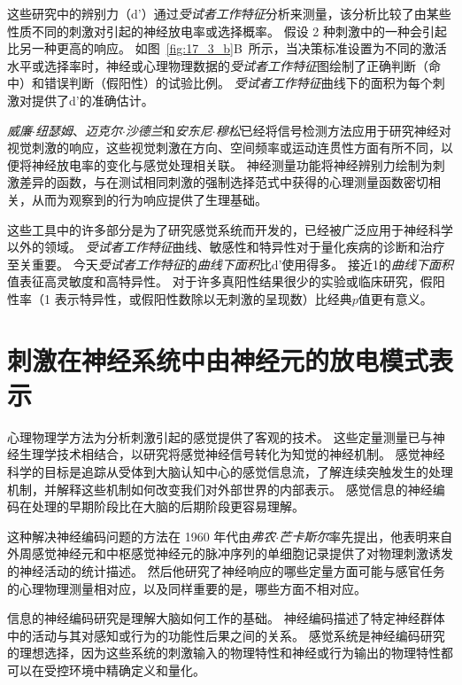 \begin{proposition}
	\quad \quad 这些研究中的辨别力（d'）通过\textit{受试者工作特征}分析来测量，该分析比较了由某些性质不同的刺激对引起的神经放电率或选择概率。
	假设 2 种刺激中的一种会引起比另一种更高的响应。
	如图~\ref{fig:17_3_b}B~所示，当决策标准设置为不同的激活水平或选择率时，神经或心理物理数据的\textit{受试者工作特征}图绘制了正确判断（命中）和错误判断（假阳性）的试验比例。
	\textit{受试者工作特征}曲线下的面积为每个刺激对提供了d'的准确估计。
	
	\quad \quad \textit{威廉$\cdot$纽瑟姆}、\textit{迈克尔$\cdot$沙德兰}和\textit{安东尼$\cdot$穆松}已经将信号检测方法应用于研究神经对视觉刺激的响应，这些视觉刺激在方向、空间频率或运动连贯性方面有所不同，以便将神经放电率的变化与感觉处理相关联\cite{britten1992analysis}。
	神经测量功能将神经辨别力绘制为刺激差异的函数，与在测试相同刺激的强制选择范式中获得的心理测量函数密切相关，从而为观察到的行为响应提供了生理基础。
	
	\quad \quad 这些工具中的许多部分是为了研究感觉系统而开发的，已经被广泛应用于神经科学以外的领域。
	\textit{受试者工作特征}曲线、敏感性和特异性对于量化疾病的诊断和治疗至关重要。
	今天\textit{受试者工作特征}的\textit{曲线下面积}比d'使用得多。
	接近1的\textit{曲线下面积}值表征高灵敏度和高特异性。
	对于许多真阳性结果很少的实验或临床研究，假阳性率（1 表示特异性，或假阳性数除以无刺激的呈现数）比经典$ p $值更有意义。
	
\end{proposition}



\section{刺激在神经系统中由神经元的放电模式表示}
心理物理学方法为分析刺激引起的感觉提供了客观的技术。 
这些定量测量已与神经生理学技术相结合，以研究将感觉神经信号转化为知觉的神经机制。 
感觉神经科学的目标是追踪从受体到大脑认知中心的感觉信息流，了解连续突触发生的处理机制，并解释这些机制如何改变我们对外部世界的内部表示。
感觉信息的神经编码在处理的早期阶段比在大脑的后期阶段更容易理解。


这种解决神经编码问题的方法在 1960 年代由\textit{弗农$\cdot$芒卡斯尔}率先提出，他表明来自外周感觉神经元和中枢感觉神经元的脉冲序列的单细胞记录提供了对物理刺激诱发的神经活动的统计描述\cite{mountcastle1966neural}。
然后他研究了神经响应的哪些定量方面可能与感官任务的心理物理测量相对应，以及同样重要的是，哪些方面不相对应。


信息的神经编码研究是理解大脑如何工作的基础。
神经编码描述了特定神经群体中的活动与其对感知或行为的功能性后果之间的关系。
感觉系统是神经编码研究的理想选择，因为这些系统的刺激输入的物理特性和神经或行为输出的物理特性都可以在受控环境中精确定义和量化。


